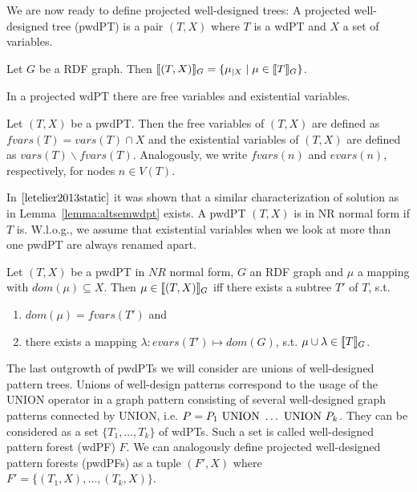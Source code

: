 We are now ready to define projected well-designed trees:
A projected well-designed tree (pwdPT) is a pair $(T,X)$ where $T$ is a wdPT and
$X$ a set of variables.
\begin{definition}
Let $G$ be a RDF graph. 
Then $\llbracket (T,X)\rrbracket_G = \{ \mu_{|X} \mid \mu \in \llbracket T \rrbracket_G\}$.
\end{definition}

In a projected wdPT there are free variables and existential variables.
\begin{definition}
	Let $(T,X)$ be a pwdPT. Then the free variables of $(T,X)$ are defined as
	$fvars(T)= vars(T) \cap X$ and
	the existential variables of $(T,X)$ are defined as $vars(T) \backslash
	fvars(T)$.
	Analogously, we write $fvars(n)$ and $evars(n)$, respectively, for nodes
	$n\in V(T)$.
\end{definition}

In $\cite{letelier2013static}$ it was shown that a 
similar characterization of solution as in Lemma~\ref{lemma:altsemwdpt} exists.
A pwdPT $(T,X)$ is in NR normal form if $T$ is. W.l.o.g., we assume that
existential variables when we look at more than one pwdPT are always renamed apart.

\begin{lemma}
	Let $(T,X)$ be a pwdPT in $NR$ normal form, $G$ an RDF graph and $\mu$ a
	mapping with $dom(\mu) \subseteq X$. Then $\mu \in \llbracket (T,X)\rrbracket_G$ iff
	there exists a subtree $T'$ of $T$, s.t. 
	\begin{enumerate}
		\item $dom(\mu) = fvars(T')$ and
		\item there exists a mapping $\lambda: evars(T') \mapsto dom(G)$, s.t.
			$\mu \cup \lambda \in \llbracket T \rrbracket_G$.

	\end{enumerate}
\end{lemma}

The last outgrowth of pwdPTs we will consider are unions of well-designed
pattern trees. Unions of well-design patterns correspond to the usage of the
UNION operator in a graph pattern consisting of several well-designed graph
patterns connected by UNION, i.e. $P = P_1 \mbox{ UNION } \dots \mbox{ UNION } P_k$. They can be
considered as a set $\{T_1, \dots, T_k\}$ of wdPTs. Such a set is called
well-designed pattern forest (wdPF) $F$. We can analogously define projected
well-designed pattern forests (pwdPFs) as a tuple $(F',X)$ where $F'=\{(T_1,X),\dots,(T_k,X)\}$.

